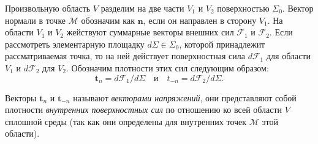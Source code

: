 Произвольную область $V$ разделим на две части $V_1$ и $V_2$ поверхностью $\Sigma_0$. Вектор нормали в точке $\mathcal{M}$ обозначим как $\mathbf{n}$, если он направлен в сторону $V_1$. На области $V_1$ и $V_2$ жействуют суммарные векторы внешних сил $\mathcal{F}_1$ и $\mathcal{F}_2$. Если рассмотреть элементарную площадку $d\Sigma \in \Sigma_0$, которой принадлежит рассматриваемая точка, то на ней действует поверхностная сила $d\mathcal{F}_1$ для области $V_1$ и $d\mathcal{F}_2$ для $V_2$. Обозначим плотности этих сил следующим образом:
\begin{equation*}
	\mathbf{t}_{n} = d\mathcal{F}_1 / d\Sigma \quad \text{и} \quad t_{-n} = d\mathcal{F}_2 / d\Sigma.
\end{equation*} 

Векторы $\mathbf{t}_n$ и $\mathbf{t}_{-n}$ называют \textit{векторами напряжений}, они представляют собой плотности \textit{внутренних поверхностных сил} по отношению ко всей области $V$ сплошной среды (так как они определены для внутренних точек $\mathcal{M}$ этой области).
